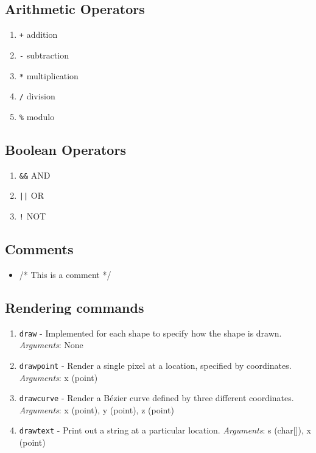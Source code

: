 \documentclass[letterpaper,12pt]{article}
\begin{document}
\subsection*{Arithmetic Operators}
\begin{enumerate}
\itemsep0em
\item \texttt{+} \space addition
\item \texttt{-} \space subtraction
\item \texttt{*} \space multiplication
\item \texttt{/} \space division
\item \texttt{\%} \space modulo
\end{enumerate}

\subsection*{Boolean Operators}
\begin{enumerate}
\itemsep0em
\item \texttt{\&\&}  AND
\item \texttt{||}   OR
\item \texttt{!}    NOT
\end{enumerate}

\subsection*{Comments}
\begin{itemize}
\item /* This is a comment */
\end{itemize}

\subsection*{Rendering commands}
\begin{enumerate}
\itemsep0em
\item \texttt{draw} - Implemented for each shape to specify how the shape is drawn.
\textit{Arguments}: None
\item \texttt{drawpoint} - Render a single pixel at a location, specified by coordinates.
\textit{Arguments}: x (point)
\item \texttt{drawcurve} - Render a B\'ezier curve defined by three different coordinates. 
\textit{Arguments}: x (point), y (point), z (point)
\item \texttt{drawtext} - Print out a string at a particular location.
\textit{Arguments}: s (char[]), x (point)
\end{enumerate}
\end{document}
